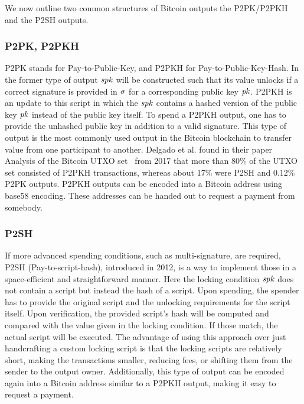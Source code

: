 We now outline two common structures of Bitcoin outputs the P2PK/P2PKH and the P2SH outputs.

\subsubsection{P2PK, P2PKH\label{sec:pre:bitcoin:p2pk}}

P2PK stands for Pay-to-Public-Key, and P2PKH for Pay-to-Public-Key-Hash.
In the former type of output $\mathit{spk}$ will be constructed such that its value unlocks if a correct signature is provided in $\mathit{\sigma}$ for a corresponding public key $\mathit{pk}$.
P2PKH is an update to this script in which the $\mathit{spk}$ contains a hashed version of the public key $\mathit{pk}$ instead of the public key itself.
To spend a P2PKH output, one has to provide the unhashed public key in addition to a valid signature.
This type of output is the most commonly used output in the Bitcoin blockchain to transfer value from one participant to another.
Delgado et al. found in their paper Analysis of the Bitcoin UTXO set~\cite{delgado2018analysis} from 2017 that more than 80\% of the UTXO set consisted of P2PKH transactions, whereas about 17\% were P2SH and 0.12\% P2PK outputs.
P2PKH outputs can be encoded into a Bitcoin address using base58 encoding.
These addresses can be handed out to request a payment from somebody.

\subsubsection{P2SH} \label{sec:pre:bitcoin:p2sh}

If more advanced spending conditions, such as multi-signature, are required, P2SH (Pay-to-script-hash), introduced in 2012, is a way to implement those in a space-efficient and straightforward manner.
Here the locking condition $\mathit{spk}$ does not contain a script but instead the hash of a script.
Upon spending, the spender has to provide the original script and the unlocking requirements for the script itself.
Upon verification, the provided script's hash will be computed and compared with the value given in the locking condition.
If those match, the actual script will be executed.
The advantage of using this approach over just handcrafting a custom locking script is that the locking scripts are relatively short, making the transactions smaller, reducing fees, or shifting them from the sender to the output owner.
Additionally, this type of output can be encoded again into a Bitcoin address similar to a P2PKH output, making it easy to request a payment.